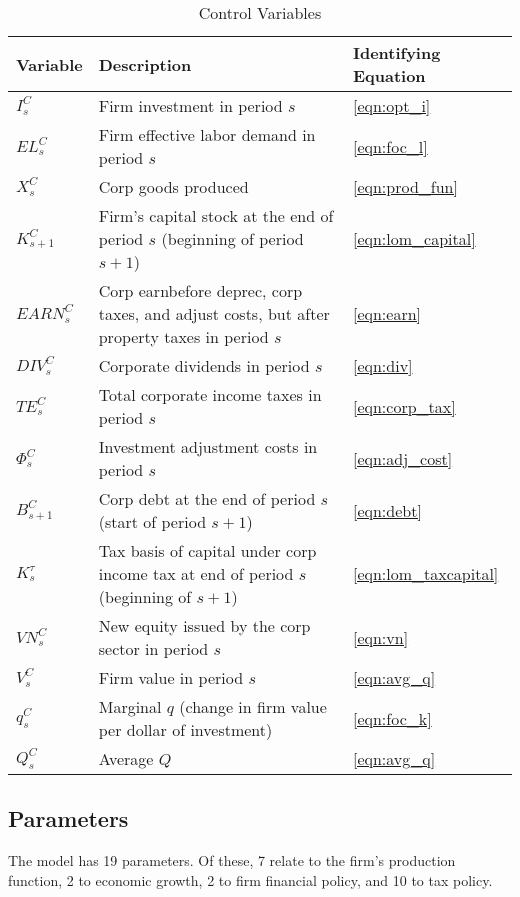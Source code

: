 \begin{table}[htbp]
  \centering
  \caption{Control Variables}
    \begin{tabular}{lll}
    \hline
    \hline
    Variable & Description & Identifying Equation \\
    \hline
    $I^{C}_{s}$ & Firm investment in period $s$ & \ref{eqn:opt_i} \\
    $EL^{C}_{s}$ & Firm effective labor demand in period $s$ & \ref{eqn:foc_l} \\
    $X^{C}_{s}$ & Corp goods produced & \ref{eqn:prod_fun} \\
    $K^{C}_{s+1}$ & Firm's capital stock at the end of period $s$ (beginning of period $s+1$) & \ref{eqn:lom_capital} \\
    $EARN^{C}_{s}$ & Corp earnbefore deprec, corp taxes, and adjust costs, but after property taxes in period $s$ & \ref{eqn:earn} \\
    $DIV^{C}_{s}$ & Corporate dividends in period $s$ & \ref{eqn:div} \\
    $TE^{C}_{s}$ & Total corporate income taxes in period $s$ & \ref{eqn:corp_tax} \\
    $\Phi^{C}_{s}$ & Investment adjustment costs in period $s$ & \ref{eqn:adj_cost} \\
    $B^{C}_{s+1}$ & Corp debt at the end of period $s$ (start of period $s+1$) & \ref{eqn:debt} \\
    $K^{\tau}_{s}$ & Tax basis of capital under corp income tax at end of period $s$ (beginning of $s+1$) & \ref{eqn:lom_taxcapital} \\
    $VN^{C}_{s}$ & New equity issued by the corp sector in period $s$ & \ref{eqn:vn} \\
    $V^{C}_{s}$ & Firm value in period $s$ & \ref{eqn:avg_q} \\
    $q^{C}_{s}$ & Marginal $q$ (change in firm value per dollar of investment) & \ref{eqn:foc_k} \\
    $Q^{C}_{s}$ & Average $Q$ & \ref{eqn:avg_q} \\
    \hline
    \hline
    \end{tabular}%
  \label{tab:control_vars}%
\end{table}%


\subsection{Parameters}

The model has 19 parameters.  Of these, 7 relate to the firm's production function, 2 to economic growth, 2 to firm financial policy, and 10 to tax policy.

